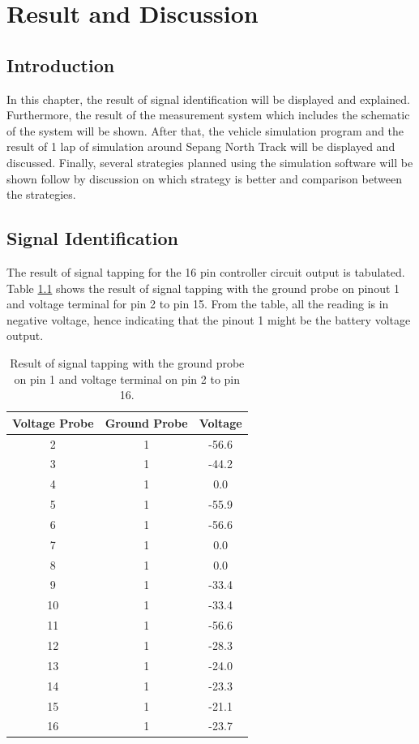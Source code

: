\chapter{Result and Discussion}

\section{Introduction}
In this chapter, the result of signal identification will be displayed and explained. Furthermore, the result of the measurement system which includes the schematic of the system will be shown. After that, the vehicle simulation program and the result of 1 lap of simulation around Sepang North Track will be displayed and discussed. Finally, several strategies planned using the simulation software will be shown follow by discussion on which strategy is better and comparison between the strategies.

\section{Signal Identification}

The result of signal tapping for the 16 pin controller circuit output is tabulated. Table \ref{tb:speedIdenGnd1} shows the result of signal tapping with the ground probe on pinout 1 and voltage terminal for pin 2 to pin 15. From the table, all the reading is in negative voltage, hence indicating that the pinout 1 might be the battery voltage output.

\begin{table}[htbp]
\begin{center}
\begin{tabular}{|c|c|c|}
\hline
\textbf{Voltage Probe} & \textbf{Ground Probe} & \textbf{Voltage} \\ \hline
2 & 1 & -56.6 \\ \hline
3 & 1 & -44.2 \\ \hline
4 & 1 & 0.0 \\ \hline
5 & 1 & -55.9 \\ \hline
6 & 1 & -56.6 \\ \hline
7 & 1 & 0.0 \\ \hline
8 & 1 & 0.0 \\ \hline
9 & 1 & -33.4 \\ \hline
10 & 1 & -33.4 \\ \hline
11 & 1 & -56.6 \\ \hline
12 & 1 & -28.3 \\ \hline
13 & 1 & -24.0 \\ \hline
14 & 1 & -23.3 \\ \hline
15 & 1 & -21.1 \\ \hline
16 & 1 & -23.7 \\ \hline
\end{tabular}
\end{center}
\caption{Result of signal tapping with the ground probe on pin 1 and voltage terminal on pin 2 to pin 16.}
\label{tb:speedIdenGnd1}
\end{table}

